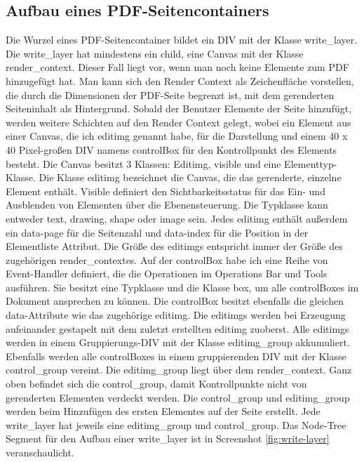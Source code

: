 \subsection{Aufbau eines PDF-Seitencontainers}
Die Wurzel eines PDF-Seitencontainer bildet ein DIV mit der Klasse write\_layer. Die write\_layer hat mindestens ein child, eine Canvas mit der Klasse render\_context. Dieser Fall liegt vor, wenn man noch keine Elemente zum PDF hinzugefügt hat. Man kann sich den Render Context als Zeichenfläche vorstellen, die durch die Dimensionen der PDF-Seite begrenzt ist, mit dem gerenderten Seiteninhalt als Hintergrund. Sobald der Benutzer Elemente der Seite hinzufügt, werden weitere Schichten auf den Render Context gelegt, wobei ein Element aus einer Canvas, die ich editimg genannt habe, für die Darstellung und einem 40 x 40 Pixel-großen DIV namens controlBox für den Kontrollpunkt des Elements besteht. Die Canvas besitzt 3 Klassen: Editimg, visible und eine Elementtyp-Klasse. Die Klasse editimg bezeichnet die Canvas, die das gerenderte, einzelne Element enthält. Visible definiert den Sichtbarkeitsstatus für das Ein- und Ausblenden von Elementen über die Ebenensteuerung. Die Typklasse kann entweder text, drawing, shape oder image sein. Jedes editimg enthält außerdem ein data-page für die Seitenzahl und data-index für die Position in der Elementliste Attribut. Die Größe des editimgs entspricht immer der Größe des zugehörigen render\_contextes. Auf der controlBox habe ich eine Reihe von Event-Handler definiert, die die Operationen im Operations Bar und Tools ausführen. Sie besitzt eine Typklasse und die Klasse box, um alle controlBoxes im Dokument ansprechen zu können. Die controlBox besitzt ebenfalls die gleichen data-Attribute wie das zugehörige editimg. Die editimgs werden bei Erzeugung aufeinander gestapelt mit dem zuletzt erstellten editimg zuoberst. Alle editimgs werden in einem Gruppierungs-DIV mit der Klasse editimg\_group akkumuliert. Ebenfalls werden alle controlBoxes in einem gruppierenden DIV mit der Klasse control\_group vereint. Die editimg\_group liegt über dem render\_context. Ganz oben befindet sich die control\_group, damit Kontrollpunkte nicht von gerenderten Elementen verdeckt werden. Die control\_group und editimg\_group werden beim Hinzufügen des ersten Elementes auf der Seite erstellt. Jede write\_layer hat jeweils eine editimg\_group und control\_group. Das Node-Tree Segment für den Aufbau einer write\_layer ist in Screenshot \ref{fig:write-layer} veranschaulicht. 

